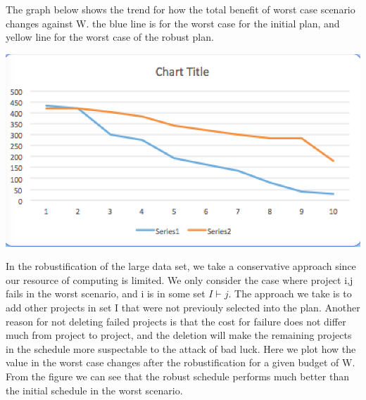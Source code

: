 \documentclass[final,3p,times]{elsarticle}
\begin{document}
The graph below shows the trend for how the total benefit of worst case scenario changes against W. the blue line is for the worst case for the initial plan, and yellow line for the worst case of the robust plan.

\includegraphics {mopta}


In the robustification of the large data set, we take a conservative approach since our resource of computing is limited. We only consider the case where project i,j fails in the worst scenario, and i is in some set $I \vdash j$. The approach we take is to add other projects in set I that were not previouly selected into the plan. Another reason for not deleting failed projects is that the cost for failure does not differ much from project to project, and the deletion will make the remaining projects in the schedule more suspectable to the attack of bad luck. Here we plot how the value in the worst case changes after the robustification for a given budget of W. From the figure we can see that the robust schedule performs much better than the initial schedule in the worst scenario.
\end{document}
